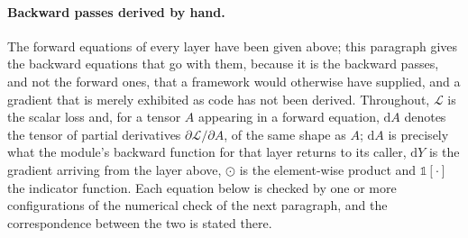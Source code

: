 \paragraph{Backward passes derived by hand.}
The forward equations of every layer have been given above; this paragraph gives the backward equations that go with them, because it is the backward passes, and not the forward ones, that a framework would otherwise have supplied, and a gradient that is merely exhibited as code has not been derived.
Throughout, $\mathcal L$ is the scalar loss and, for a tensor $A$ appearing in a forward equation, $\mathrm dA$ denotes the tensor of partial derivatives $\partial\mathcal L/\partial A$, of the same shape as $A$; $\mathrm dA$ is precisely what the module's backward function for that layer returns to its caller, $\mathrm dY$ is the gradient arriving from the layer above, $\odot$ is the element-wise product and $\mathbb 1[\cdot]$ the indicator function.
Each equation below is checked by one or more configurations of the numerical check of the next paragraph, and the correspondence between the two is stated there.

